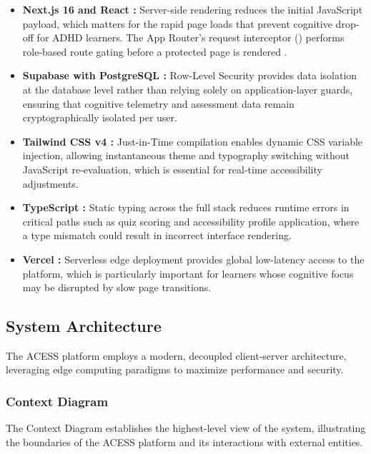 \documentclass[12pt, oneside]{article} %
\newcommand{\tcode}[1]{\path{#1}}
\begin{document}
\begin{itemize}
    \item \textbf{Next.js 16 and React \cite{nextjs_ssr}:} Server-side rendering reduces the initial JavaScript payload, which matters for the rapid page loads that prevent cognitive drop-off for ADHD learners. The App Router's request interceptor (\tcode{src/proxy.ts}) performs role-based route gating before a protected page is rendered \cite{nextjs_middleware}.
    \item \textbf{Supabase with PostgreSQL \cite{supabase_docs}:} Row-Level Security provides data isolation \cite{supabase_rls} at the database level rather than relying solely on application-layer guards, ensuring that cognitive telemetry and assessment data remain cryptographically isolated per user.
    \item \textbf{Tailwind CSS v4 \cite{tailwind_docs}:} Just-in-Time compilation enables dynamic CSS variable injection, allowing instantaneous theme and typography switching without JavaScript re-evaluation, which is essential for real-time accessibility adjustments.
    \item \textbf{TypeScript \cite{typescript_docs}:} Static typing across the full stack reduces runtime errors in critical paths such as quiz scoring and accessibility profile application, where a type mismatch could result in incorrect interface rendering.
    \item \textbf{Vercel \cite{vercel_docs}:} Serverless edge deployment provides global low-latency access to the platform, which is particularly important for learners whose cognitive focus may be disrupted by slow page transitions.
\end{itemize}

\subsection{System Architecture}

The ACESS platform employs a modern, decoupled client-server architecture, leveraging edge computing paradigms to maximize performance and security.

\subsubsection{Context Diagram}
The Context Diagram establishes the highest-level view of the system, illustrating the boundaries of the ACESS platform and its interactions with external entities.
\end{document}

